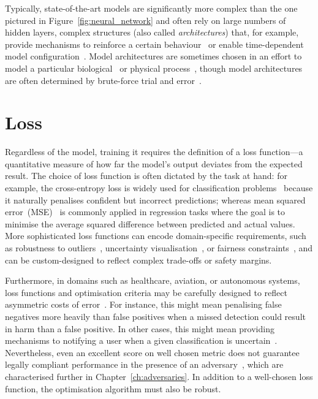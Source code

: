 Typically, state-of-the-art models are significantly more complex than the one pictured in Figure~\ref{fig:neural_network} and often rely on large numbers of hidden layers, complex structures (also called \textit{architectures}) that, for example, provide mechanisms to reinforce a certain behaviour~\cite{reinforcement_learning} or enable time-dependent model configuration~\cite{lstm}.
Model architectures are sometimes chosen in an effort to model a particular biological~\cite{biomimicry_nn} or physical process~\cite{physics_nn}, though model architectures are often determined by brute-force trial and error~\cite{nn_architectures_brute_force}.


\section{Loss}
Regardless of the model, training it requires the definition of a loss function---a quantitative measure of how far the model’s output deviates from the expected result. 
The choice of loss function is often dictated by the task at hand: for example, the cross-entropy loss is widely used for classification problems~\cite{shalev2014understanding} because it naturally penalises confident but incorrect predictions; whereas mean squared error~(MSE)~\cite{stats} is commonly applied in regression tasks where the goal is to minimise the average squared difference between predicted and actual values. 
More sophisticated loss functions can encode domain-specific requirements, such as robustness to outliers~\cite{zhang2015outlier}, uncertainty visualisation~\cite{model_uncertainty}, or fairness constraints~\cite{mehrabi2021survey}, and can be custom-designed to reflect complex trade-offs or safety margins.

Furthermore, in domains such as healthcare, aviation, or autonomous systems, loss functions and optimisation criteria may be carefully designed to reflect asymmetric costs of error~\cite{meyers2023safety}. 
For instance, this might mean penalising false negatives more heavily than false positives when a missed detection could result in harm than a false positive. 
In other cases, this might mean providing mechanisms to notifying a user when a given classification is uncertain~\cite{model_uncertainty}.
Nevertheless, even an excellent score on well chosen metric does not guarantee legally compliant performance in the presence of an adversary~\cite{meyers2023safety,meyers2024massively,trashfire,meyers_aft}, which are characterised further in Chapter~\ref{ch:adversaries}. 
In addition to a well-chosen loss function, the optimisation algorithm must also be robust.


